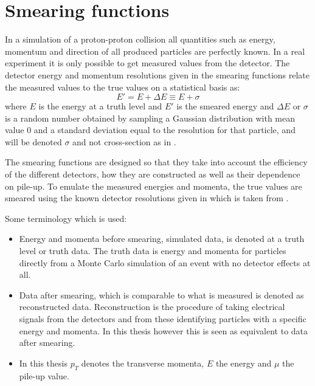 \section{Smearing functions}\label{sec:smear}
In a simulation of a proton-proton collision all quantities such as energy, momentum and direction of all produced particles are perfectly known. In a real experiment it is only possible to get measured values from the detector. The detector energy and momentum resolutions given in the smearing functions relate the measured values to the true values on a statistical basis as:
\begin{equation}\label{eq:smear}
E' = E + \Delta E \equiv E + \sigma
\end{equation}
where $E$ is the energy at a truth level and $E'$ is the smeared energy and $\Delta E$ or $\sigma$ is a random number obtained by sampling a Gaussian distribution with mean value 0 and a standard deviation equal to the resolution for that particle, and will be denoted $\sigma$ and not cross-section as in .

The smearing functions are designed so that they take into account the efficiency of the different detectors, how they are constructed as well as their dependence on pile-up. To emulate the measured energies and momenta, the true values are smeared using the known detector resolutions given in  which is taken from \citep{ATL-PHYS-PUB-2013-004}. 

Some terminology which is used:
\begin{itemize}
\item Energy and momenta before smearing, simulated data, is denoted at a truth level or truth data. The truth data is energy and momenta for particles directly from a Monte Carlo simulation of an event with no detector effects at all.
\item Data after smearing, which is comparable to what is measured is denoted as reconstructed data. Reconstruction is the procedure of taking electrical signals from the detectors and from these identifying particles with a specific energy and momenta. In this thesis however this is seen as equivalent to data after smearing.
\item In this thesis $p_T$ denotes the transverse momenta, $E$ the energy and $\mu$ the pile-up value.
\end{itemize}

